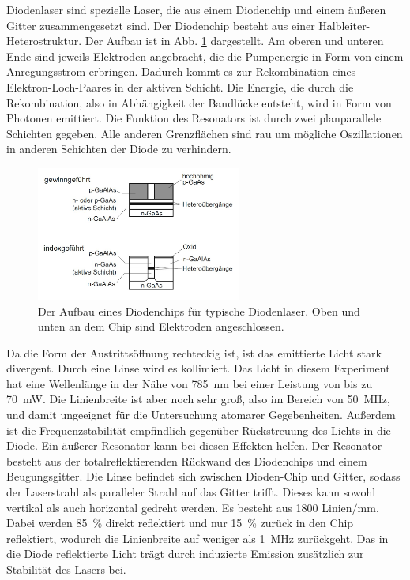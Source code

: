 Diodenlaser sind spezielle Laser, die aus einem Diodenchip und einem äußeren Gitter zusammengesetzt sind. 
Der Diodenchip besteht aus einer Halbleiter-Heterostruktur. Der Aufbau ist in Abb. \ref{abb:chip} dargestellt. Am oberen und unteren Ende sind jeweils Elektroden angebracht, die die Pumpenergie in Form von einem Anregungsstrom erbringen. Dadurch kommt es zur Rekombination eines Elektron-Loch-Paares in der aktiven Schicht. Die Energie, die durch die Rekombination, also in Abhängigkeit der Bandlücke entsteht, wird in Form von Photonen emittiert. Die Funktion des Resonators ist durch zwei planparallele Schichten gegeben. Alle anderen Grenzflächen sind rau um mögliche Oszillationen in anderen Schichten der Diode zu verhindern.  

\begin{figure}
    \centering
    \includegraphics[width=0.6\textwidth]{pics/chip.jpg}
    \caption{Der Aufbau eines Diodenchips für typische Diodenlaser. Oben und unten an dem Chip sind Elektroden angeschlossen. \cite{eichler}}
    \label{abb:chip}
\end{figure}


Da die Form der Austrittsöffnung rechteckig ist, ist das emittierte Licht stark divergent. Durch eine Linse wird es kollimiert. Das Licht in diesem Experiment hat eine Wellenlänge in der Nähe von \SI{785}{\nm} bei einer Leistung von bis zu \SI{70}{\mW}. Die Linienbreite ist aber noch sehr groß, also im Bereich von \SI{50}{\MHz}, und damit ungeeignet für die Untersuchung atomarer Gegebenheiten. Außerdem ist die Frequenzstabilität empfindlich gegenüber Rückstreuung des Lichts in die Diode. Ein äußerer Resonator kann bei diesen Effekten helfen.
Der Resonator besteht aus der totalreflektierenden Rückwand des Diodenchips und einem Beugungsgitter.
Die Linse befindet sich zwischen Dioden-Chip und Gitter, sodass der Laserstrahl als paralleler Strahl auf das Gitter trifft.
Dieses kann sowohl vertikal als auch horizontal gedreht werden. 
Es besteht aus \num{1800} Linien$/$\si{\milli\metre}. Dabei werden \SI{85}{\percent} direkt reflektiert und nur \SI{15}{\percent} zurück in den Chip reflektiert, wodurch die Linienbreite auf weniger als \SI{1}{\MHz} zurückgeht. Das in die Diode reflektierte Licht trägt durch induzierte Emission zusätzlich zur Stabilität des Lasers bei. \cite{anleitung}

